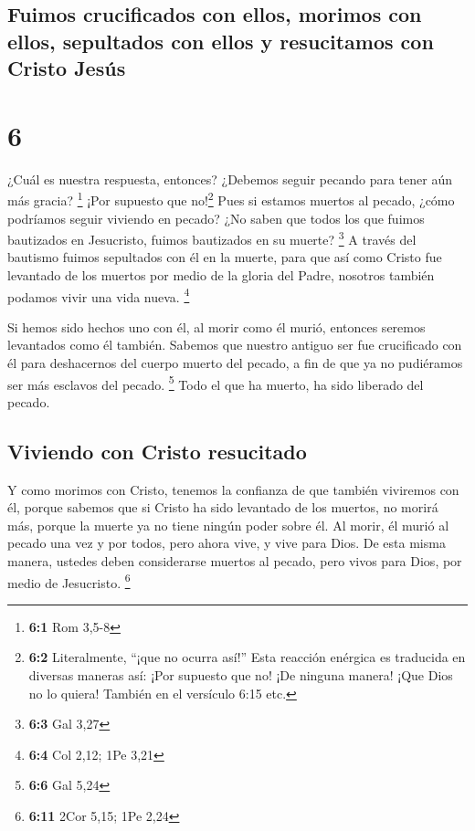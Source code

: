 \hypertarget{fuimos-crucificados-con-ellos-morimos-con-ellos-sepultados-con-ellos-y-resucitamos-con-cristo-jesuxfas}{%
\subsection{Fuimos crucificados con ellos, morimos con ellos, sepultados
con ellos y resucitamos con Cristo
Jesús}\label{fuimos-crucificados-con-ellos-morimos-con-ellos-sepultados-con-ellos-y-resucitamos-con-cristo-jesuxfas}}

\hypertarget{section-5}{%
\section{6}\label{section-5}}

 ¿Cuál es nuestra respuesta, entonces? ¿Debemos seguir
pecando para tener aún más gracia? \footnote{\textbf{6:1} Rom 3,5-8}
 ¡Por supuesto que no!\footnote{\textbf{6:2} Literalmente,
  ``¡que no ocurra así!'' Esta reacción enérgica es traducida en
  diversas maneras así: ¡Por supuesto que no! ¡De ninguna manera! ¡Que
  Dios no lo quiera! También en el versículo 6:15 etc.} Pues si estamos
muertos al pecado, ¿cómo podríamos seguir viviendo en pecado?
 ¿No saben que todos los que fuimos bautizados en
Jesucristo, fuimos bautizados en su muerte? \footnote{\textbf{6:3} Gal
  3,27}  A través del bautismo fuimos sepultados con él en
la muerte, para que así como Cristo fue levantado de los muertos por
medio de la gloria del Padre, nosotros también podamos vivir una vida
nueva. \footnote{\textbf{6:4} Col 2,12; 1Pe 3,21}

 Si hemos sido hechos uno con él, al morir como él murió,
entonces seremos levantados como él también.  Sabemos que
nuestro antiguo ser fue crucificado con él para deshacernos del cuerpo
muerto del pecado, a fin de que ya no pudiéramos ser más esclavos del
pecado. \footnote{\textbf{6:6} Gal 5,24}  Todo el que ha
muerto, ha sido liberado del pecado.

\hypertarget{viviendo-con-cristo-resucitado}{%
\subsection{Viviendo con Cristo
resucitado}\label{viviendo-con-cristo-resucitado}}

 Y como morimos con Cristo, tenemos la confianza de que
también viviremos con él,  porque sabemos que si Cristo ha
sido levantado de los muertos, no morirá más, porque la muerte ya no
tiene ningún poder sobre él.  Al morir, él murió al
pecado una vez y por todos, pero ahora vive, y vive para Dios.
 De esta misma manera, ustedes deben considerarse muertos
al pecado, pero vivos para Dios, por medio de Jesucristo. \footnote{\textbf{6:11}
  2Cor 5,15; 1Pe 2,24}

